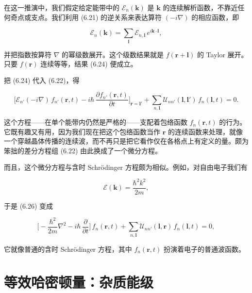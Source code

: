在这一推演中，我们假定给定能带中的 $\mathcal{E}_n(\mathbf{k})$ 是 $\mathbf{k}$ 的连续解析函数，不靠近任何奇点或支点。我们利用 (6.21) 的逆关系来表达算符 $(-i\nabla)$ 的相应函数，即

\begin{equation*}
\mathcal{E}_n(\mathbf{k}) = \sum_{\boldsymbol{l}} \mathcal{E}_{n,\boldsymbol{l}}\,e^{i\mathbf{k}\cdot\boldsymbol{l}},
\tag{6.25}
\end{equation*}

并把指数按算符 $\nabla$ 的幂级数展开。这个级数结果就是 $f(\mathbf{r}+\boldsymbol{l})$ 的 Taylor 展开。只要 $f(\mathbf{r})$ 连续等等，结果 (6.24) 便成立。

把 (6.24) 代入 (6.22)，得

\begin{equation*}
\Big[\mathcal{E}_{n'}(-i\nabla)\,f_{n'}(\mathbf{r},t) - i\hbar\,\frac{\partial f_{n'}(\mathbf{r},t)}{\partial t}\Big]_{\mathbf{r}=\boldsymbol{l}'} + \sum_{n,\boldsymbol{l}} \mathcal{U}_{nn'}(\boldsymbol{l},\boldsymbol{l}')\,f_n(\boldsymbol{l},t) = 0.
\tag{6.26}
\end{equation*}

这个方程——在单个能带内仍然是严格的——支配着包络函数 $f_n(\mathbf{r},t)$ 的行为。它既有趣又有用，因为我们现在把这个包络函数当作 $\mathbf{r}$ 的连续函数来处理，就像一个穿越晶体传播的连续波，而不再只是把它看作仅在各格点上有定义的量。颇为笨拙的差分方程组 (6.22) 由此换成了一个微分方程。

而且，这个微分方程与含时 Schrödinger 方程颇为相似。例如，对自由电子我们有

\begin{equation*}
\mathcal{E}(\mathbf{k}) = \frac{\hbar^2 k^2}{2m},
\tag{6.27}
\end{equation*}

于是 (6.26) 变成

\begin{equation*}
\Big[-\frac{\hbar^2}{2m}\nabla^2 - i\hbar\,\frac{\partial}{\partial t}\Big]\,f_n(\mathbf{r},t) + \sum_{n,\boldsymbol{l}} \mathcal{U}_{nn'}(\boldsymbol{l},\mathbf{r})\,f_n(\boldsymbol{l},t) = 0,
\tag{6.28}
\end{equation*}

它就像普通的含时 Schrödinger 方程，其中 $f_n(\mathbf{r},t)$ 扮演着电子的普通波函数。

\section{等效哈密顿量：杂质能级}

